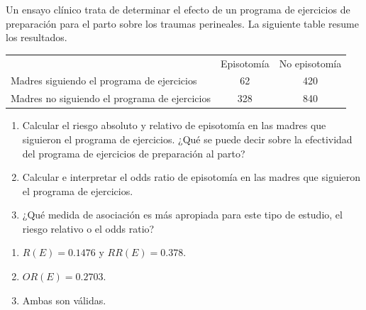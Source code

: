 {Un ensayo clínico trata de determinar el efecto de un programa de ejercicios de preparación para el parto sobre los traumas perineales.
La siguiente table resume los resultados.
\begin{center}
	\begin{tabular}{lcc}
		\toprule
		 & Episotomía & No episotomía\\
		 Madres siguiendo el programa de ejercicios & 62 & 420 \\
		 Madres no siguiendo el programa de ejercicios & 328 & 840\\
		\bottomrule
	\end{tabular}
\end{center}

\begin{enumerate}
\item Calcular el riesgo absoluto y relativo de episotomía en las madres que siguieron el programa de ejercicios.
¿Qué se puede decir sobre la efectividad del programa de ejercicios de preparación al parto?
\item Calcular e interpretar el odds ratio de episotomía en las madres que siguieron el programa de ejercicios.
\item ¿Qué medida de asociación es más apropiada para este tipo de estudio, el riesgo relativo o el odds ratio?
\end{enumerate}
}
{
\begin{enumerate}
\item $R(E)=0.1476$ y $RR(E)=0.378$.
\item $OR(E)=0.2703$.
\item Ambas son válidas.
\end{enumerate}
}
{}